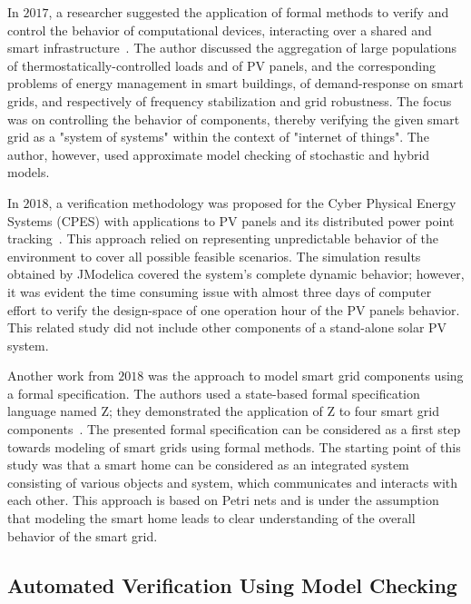 \documentclass[review]{elsarticle}
\begin{document}
In $2017$, a researcher suggested the application of formal methods to verify and control the behavior of computational devices, interacting over a shared and smart infrastructure~\cite{Abate2017}. The author discussed the aggregation of large populations of thermostatically-controlled loads and of PV panels, and the corresponding problems of energy management in smart buildings, of demand-response on smart grids, and respectively of frequency stabilization and grid robustness. The focus was on controlling the behavior of components, thereby verifying the given smart grid as a "system of systems" within the context of "internet of things". The author, however, used approximate model checking of stochastic and hybrid models.

In $2018$, a verification methodology was proposed for the Cyber Physical Energy Systems (CPES) with applications to PV panels and its distributed power point tracking~\cite{Driouich2018}. This approach relied on representing unpredictable behavior of the environment to cover all possible feasible scenarios. The simulation results obtained by JModelica covered the system's complete dynamic behavior; however, it was evident the time consuming issue with almost three days of computer effort to verify the design-space of one operation hour of the PV panels behavior. This related study did not include other components of a stand-alone solar PV system.

Another work from $2018$ was the approach to model smart grid components using a formal specification. The authors used a state-based formal specification language named Z; they demonstrated the application of Z to four smart grid components~\cite{Akram2018}. The presented formal specification can be considered as a first step towards modeling of smart grids using formal methods. The starting point of this study was that a smart home can be considered as an integrated system consisting of various objects and system, which communicates and interacts with each other. This approach is based on Petri nets and is under the assumption that modeling the smart home leads to clear understanding of the overall behavior of the smart grid.

\subsection{Automated Verification Using Model Checking}
\label{sec:AutomatedVerification}
\end{document}
